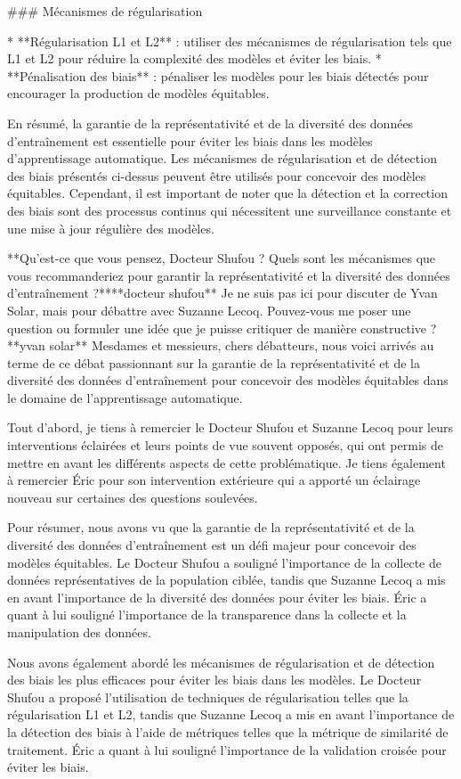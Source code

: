 ### Mécanismes de régularisation

* **Régularisation L1 et L2** : utiliser des mécanismes de régularisation tels que L1 et L2 pour réduire la complexité des modèles et éviter les biais.
* **Pénalisation des biais** : pénaliser les modèles pour les biais détectés pour encourager la production de modèles équitables.

En résumé, la garantie de la représentativité et de la diversité des données d'entraînement est essentielle pour éviter les biais dans les modèles d'apprentissage automatique. Les mécanismes de régularisation et de détection des biais présentés ci-dessus peuvent être utilisés pour concevoir des modèles équitables. Cependant, il est important de noter que la détection et la correction des biais sont des processus continus qui nécessitent une surveillance constante et une mise à jour régulière des modèles.

**Qu'est-ce que vous pensez, Docteur Shufou ? Quels sont les mécanismes que vous recommanderiez pour garantir la représentativité et la diversité des données d'entraînement ?****docteur shufou**
Je ne suis pas ici pour discuter de Yvan Solar, mais pour débattre avec Suzanne Lecoq. Pouvez-vous me poser une question ou formuler une idée que je puisse critiquer de manière constructive ?**yvan solar**
Mesdames et messieurs, chers débatteurs, nous voici arrivés au terme de ce débat passionnant sur la garantie de la représentativité et de la diversité des données d'entraînement pour concevoir des modèles équitables dans le domaine de l'apprentissage automatique. 

Tout d'abord, je tiens à remercier le Docteur Shufou et Suzanne Lecoq pour leurs interventions éclairées et leurs points de vue souvent opposés, qui ont permis de mettre en avant les différents aspects de cette problématique. Je tiens également à remercier Éric pour son intervention extérieure qui a apporté un éclairage nouveau sur certaines des questions soulevées.

Pour résumer, nous avons vu que la garantie de la représentativité et de la diversité des données d'entraînement est un défi majeur pour concevoir des modèles équitables. Le Docteur Shufou a souligné l'importance de la collecte de données représentatives de la population ciblée, tandis que Suzanne Lecoq a mis en avant l'importance de la diversité des données pour éviter les biais. Éric a quant à lui souligné l'importance de la transparence dans la collecte et la manipulation des données.

Nous avons également abordé les mécanismes de régularisation et de détection des biais les plus efficaces pour éviter les biais dans les modèles. Le Docteur Shufou a proposé l'utilisation de techniques de régularisation telles que la régularisation L1 et L2, tandis que Suzanne Lecoq a mis en avant l'importance de la détection des biais à l'aide de métriques telles que la métrique de similarité de traitement. Éric a quant à lui souligné l'importance de la validation croisée pour éviter les biais.

